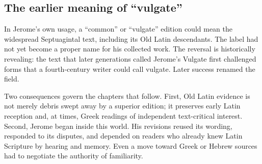 \subsection{The earlier meaning of ``vulgate''}

In Jerome's own usage, a ``common'' or ``vulgate'' edition could mean the widespread Septuagintal text, including its Old Latin descendants. The label had not yet become a proper name for his collected work. The reversal is historically revealing: the text that later generations called Jerome's Vulgate first challenged forms that a fourth-century writer could call vulgate. Later success renamed the field.

Two consequences govern the chapters that follow. First, Old Latin evidence is not merely debris swept away by a superior edition; it preserves early Latin reception and, at times, Greek readings of independent text-critical interest. Second, Jerome began inside this world. His revisions reused its wording, responded to its disputes, and depended on readers who already knew Latin Scripture by hearing and memory. Even a move toward Greek or Hebrew sources had to negotiate the authority of familiarity.
